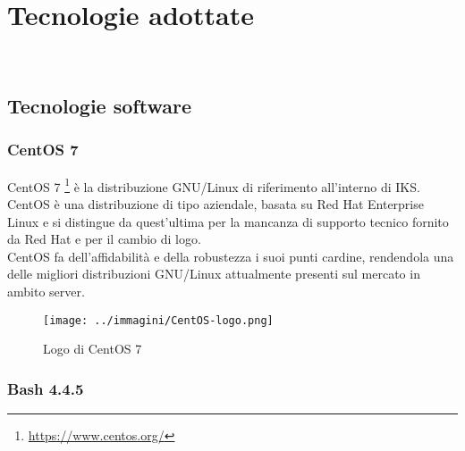 
\pagestyle{IHA-fancy-style}
\chapter{Tecnologie adottate}
\label{cap:tecnologie-adottate}

\\

\section{Tecnologie software}

\subsection{CentOS 7}

\gls{CentOS} 7 \footnote{\url{https://www.centos.org/}} è la distribuzione \gls{GNU}/\gls{Linux} di riferimento all'interno di IKS. \gls{CentOS} è una distribuzione di tipo aziendale, basata su \gls{Red Hat} Enterprise \gls{Linux} e si distingue da quest'ultima per la mancanza di supporto tecnico fornito da \gls{Red Hat} e per il cambio di logo.\\
\gls{CentOS} fa dell'affidabilità e della robustezza i suoi punti cardine, rendendola una delle migliori distribuzioni \gls{GNU}/\gls{Linux} attualmente presenti sul mercato in ambito server.

\begin{figure}[H]
    \capstart
    \centering
    \texttt{[image: ../immagini/CentOS-logo.png]}
    \caption{Logo di CentOS 7}
\end{figure}

\newpage

\subsection{Bash 4.4.5}

